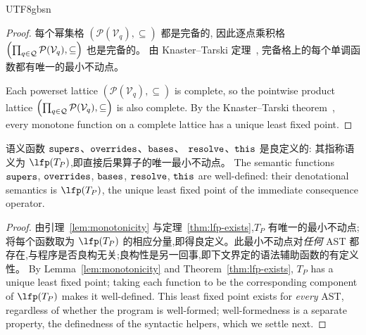 \begin{CJK*}{UTF8}{gbsn}
\begin{proof}
\ifPaperChinese
  每个幂集格
  $(\mathcal{P}(\mathcal{V}_q), \subseteq)$
  都是完备的,
  因此逐点乘积格
  $\Bigl(\prod_{q \in \mathcal{Q}} \mathcal{P}(\mathcal{V}_q), \subseteq\Bigr)$
  也是完备的。
  由 Knaster--Tarski 定理~\cite{tarski1955-lattice-fixpoint-theorem},
  完备格上的每个单调函数都有唯一的最小不动点。
\else
  \begin{sloppypar}
  Each powerset lattice
  $(\mathcal{P}(\mathcal{V}_q), \subseteq)$
  is complete,
  so the pointwise product lattice
  $\Bigl(\prod_{q \in \mathcal{Q}} \mathcal{P}(\mathcal{V}_q), \subseteq\Bigr)$
  is also complete.
  By the Knaster--Tarski
  theorem~\cite{tarski1955-lattice-fixpoint-theorem},
  every monotone function on a complete lattice has a
  unique least fixed point.
  \end{sloppypar}
\fi
\end{proof}

\begin{theorem}\label{thm:well-defined}
  \ifPaperChinese
  语义函数 $\mathtt{supers}$、\allowbreak$\mathtt{overrides}$、\allowbreak$\mathtt{bases}$、\allowbreak
  $\mathtt{resolve}$、\allowbreak$\mathtt{this}$ 是良定义的:
  其指称语义为 $\lfp(T_P)$,即直接后果算子的唯一最小不动点。
  \else
  The semantic functions
  $\mathtt{supers}$, $\mathtt{overrides}$, $\mathtt{bases}$,
  $\mathtt{resolve}$, $\mathtt{this}$ are well-defined:
  their denotational semantics is
  $\lfp(T_P)$, the unique least fixed point of
  the immediate consequence operator.
  \fi
\end{theorem}

\begin{proof}
\ifPaperChinese
  由引理~\ref{lem:monotonicity} 与定理~\ref{thm:lfp-exists},$T_P$ 有唯一的最小不动点;
  将每个函数取为 $\lfp(T_P)$ 的相应分量,即得良定义。此最小不动点对\emph{任何}
  AST 都存在,与程序是否良构无关;良构性是另一回事,即下文界定的语法辅助函数的有定义性。
\else
  By Lemma~\ref{lem:monotonicity} and
  Theorem~\ref{thm:lfp-exists}, $T_P$ has a unique least
  fixed point; taking each function to be the
  corresponding component of $\lfp(T_P)$ makes it
  well-defined. This least fixed point exists for
  \emph{every} AST, regardless of whether the program is
  well-formed; well-formedness is a separate property, the
  definedness of the syntactic helpers, which we settle
  next.
\fi
\end{proof}


\end{CJK*}
